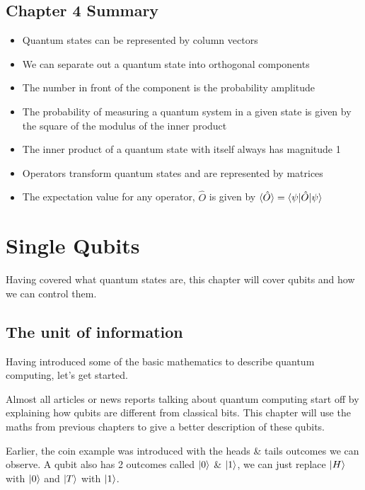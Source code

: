 \documentclass{book}
\begin{document}
\section{Chapter 4 Summary }

\begin{itemize}

    \item Quantum states can be represented by column vectors 
    \item We can separate out a quantum state into orthogonal components 
    \item The number in front of the component is the probability amplitude
    \item The probability of measuring a quantum system in a given state is given by the square of the modulus of the inner product
    \item The inner product of a quantum state with itself always has magnitude 1
    \item Operators transform quantum states and are represented by matrices
    \item The expectation value for any operator, $\hat{O}$  is given by $\braket{\hat{O}} = \braket{\psi|\hat{O}|\psi}$
\end{itemize}


\chapter{Single Qubits}

Having covered what quantum states are, this chapter will cover qubits and how we can control them. 

\section{ The unit of information}

Having introduced some of the basic mathematics to describe quantum computing, let's get started. 

Almost all articles or news reports talking about quantum computing start off by explaining how qubits are different from classical bits. This chapter will use the maths from previous chapters to give a better description of these qubits. 

Earlier, the coin example was introduced with the heads & tails outcomes we can observe. A qubit also has 2 outcomes called $\ket{0}$ & $\ket{1}$, we can just replace $\ket{H}$ with $\ket{0}$ and $\ket{T}$ with $\ket{1}$. 
\end{document}
